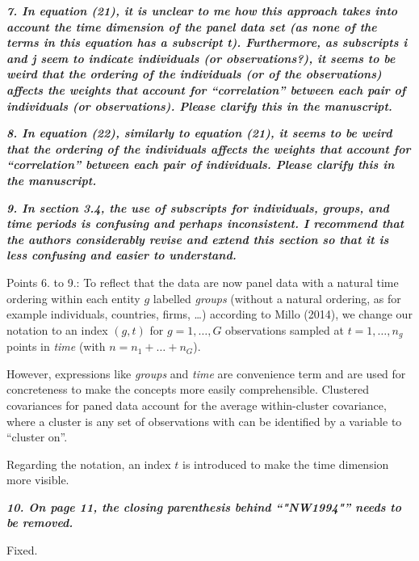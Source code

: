 \documentclass[10pt,a4paper]{article}
\begin{document}
\medskip

\textbf{\textit{7. In equation (21), it is unclear to me how this approach takes into account the time
dimension of the panel data set (as none of the terms in this equation has a subscript t).
Furthermore, as subscripts i and j seem to indicate individuals (or observations?), it
seems to be weird that the ordering of the individuals (or of the observations) affects the
weights that account for ``correlation'' between each pair of individuals (or observations).
Please clarify this in the manuscript.}}

\medskip

\textbf{\textit{8. In equation (22), similarly to equation (21), it seems to be weird that the ordering of
the individuals affects the weights that account for ``correlation'' between each pair of
individuals. Please clarify this in the manuscript.}}

\medskip

\textbf{\textit{9. In section 3.4, the use of subscripts for individuals, groups, and time periods is confusing
and perhaps inconsistent. I recommend that the authors considerably revise and extend
this section so that it is less confusing and easier to understand.}}

\medskip

 Points 6. to 9.: To reflect that the data are now panel data with a natural time ordering within each entity $g$ labelled \emph{groups} (without a natural ordering, as for example individuals, countries, firms, \ldots) according to Millo (2014), we change our notation
to an index $(g, t)$ for $g = 1, \dots, G$ observations sampled at $t = 1, \ldots, n_g$ points in \emph{time} (with $n = n_1 + \dots + n_G$).

However, expressions like \emph{groups} and \emph{time} are convenience term and are used for concreteness to make the concepts more easily comprehensible. Clustered covariances for paned data account for the average within-cluster covariance, where a cluster is any set of observations with can be identified by a variable to ``cluster on''. 

Regarding the notation, an index $t$ is introduced to make the time dimension more visible.

\medskip

\textbf{\textit{10. On page 11, the closing parenthesis behind ``"NW1994"'' needs to be removed.}}

\medskip

Fixed.
\end{document}
